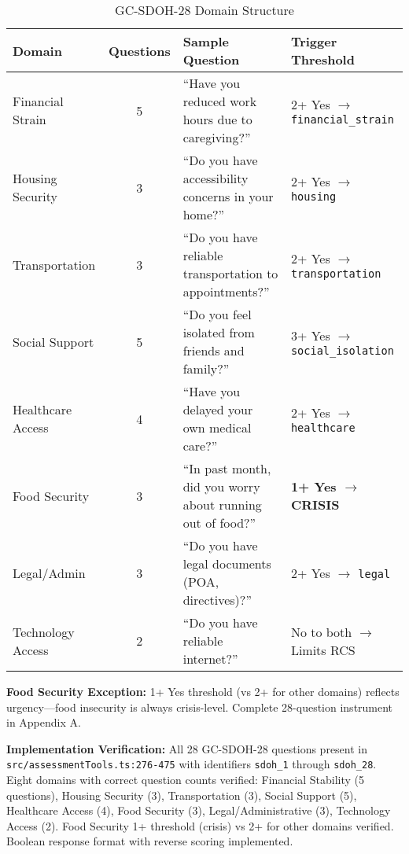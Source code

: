 \documentclass{article}
\begin{document}
\begin{table}[h]
\centering
\caption{GC-SDOH-28 Domain Structure}
\label{table:sdoh_domains}
\small
\begin{tabular}{p{2.5cm}cp{4.5cm}p{2.8cm}}
\toprule
\textbf{Domain} & \textbf{Questions} & \textbf{Sample Question} & \textbf{Trigger Threshold} \\
\midrule
Financial Strain & 5 & ``Have you reduced work hours due to caregiving?'' & 2+ Yes $\rightarrow$ \texttt{financial\_strain} \\
Housing Security & 3 & ``Do you have accessibility concerns in your home?'' & 2+ Yes $\rightarrow$ \texttt{housing} \\
Transportation & 3 & ``Do you have reliable transportation to appointments?'' & 2+ Yes $\rightarrow$ \texttt{transportation} \\
Social Support & 5 & ``Do you feel isolated from friends and family?'' & 3+ Yes $\rightarrow$ \texttt{social\_isolation} \\
Healthcare Access & 4 & ``Have you delayed your own medical care?'' & 2+ Yes $\rightarrow$ \texttt{healthcare} \\
Food Security & 3 & ``In past month, did you worry about running out of food?'' & \textbf{1+ Yes $\rightarrow$ CRISIS} \\
Legal/Admin & 3 & ``Do you have legal documents (POA, directives)?'' & 2+ Yes $\rightarrow$ \texttt{legal} \\
Technology Access & 2 & ``Do you have reliable internet?'' & No to both $\rightarrow$ Limits RCS \\
\bottomrule
\end{tabular}
\end{table}

\textbf{Food Security Exception:} 1+ Yes threshold (vs 2+ for other domains) reflects urgency—food insecurity is always crisis-level. Complete 28-question instrument in Appendix A.

\textbf{Implementation Verification:} All 28 GC-SDOH-28 questions present in \texttt{src/assessmentTools.ts:276-475} with identifiers \texttt{sdoh\_1} through \texttt{sdoh\_28}. Eight domains with correct question counts verified: Financial Stability (5 questions), Housing Security (3), Transportation (3), Social Support (5), Healthcare Access (4), Food Security (3), Legal/Administrative (3), Technology Access (2). Food Security 1+ threshold (crisis) vs 2+ for other domains verified. Boolean response format with reverse scoring implemented.
\end{document}
